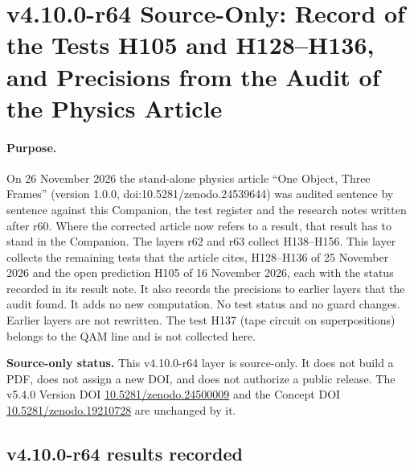 
\clearpage
\section*{v4.10.0-r64 Source-Only: Record of the Tests H105 and H128--H136, and Precisions from the Audit of the Physics Article}
\label{sec:v4100-r64-record-audit}

\paragraph{Purpose.}
On 26 November 2026 the stand-alone physics article ``One Object, Three Frames'' (version 1.0.0, doi:10.5281/zenodo.24539644) was audited
sentence by sentence against this Companion, the test register and the research notes written after r60.  Where the corrected article now
refers to a result, that result has to stand in the Companion.  The layers r62 and r63 collect H138--H156.  This layer collects the remaining
tests that the article cites, H128--H136 of 25 November 2026 and the open prediction H105 of 16 November 2026, each with the status recorded in
its result note.  It also records the precisions to earlier layers that the audit found.  It adds no new computation.  No test status and no
guard changes.  Earlier layers are not rewritten.  The test H137 (tape circuit on superpositions) belongs to the QAM line and is not collected here.

\noindent\textbf{Source-only status.}
This v4.10.0-r64 layer is source-only.  It does not build a PDF, does not assign a new DOI,
and does not authorize a public release.  The v5.4.0 Version DOI
\href{https://doi.org/10.5281/zenodo.24500009}{10.5281/zenodo.24500009} and the Concept DOI
\href{https://doi.org/10.5281/zenodo.19210728}{10.5281/zenodo.19210728} are unchanged by it.

\subsection*{v4.10.0-r64 results recorded}
\label{subsec:v4100-r64-results}

